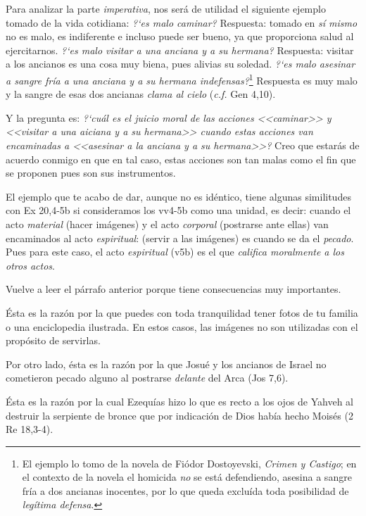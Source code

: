 \documentclass{article}
\begin{document}
Para analizar la parte \emph{imperativa}, nos ser\'a de utilidad el siguiente ejemplo tomado de la vida cotidiana: \emph{?`es malo caminar?} Respuesta: tomado en \emph{s\'i mismo} no es malo, es indiferente e incluso puede ser bueno, ya que proporciona salud al ejercitarnos. \emph{?`es malo visitar a una anciana y a su hermana?} Respuesta: visitar a los ancianos es una cosa muy biena, pues alivias su soledad. \emph{?`es malo asesinar a sangre fr\'{i}a a una anciana y a su hermana indefensas?}\footnote{El ejemplo lo tomo de la novela de Fiódor Dostoyevski, \emph{Crimen y Castigo}; en el contexto de la novela el homicida \emph{no} se est\'a defendiendo, asesina a sangre fr\'{i}a a dos ancianas inocentes, por lo que queda exclu\'{i}da toda posibilidad de \emph{leg\'{i}tima defensa}.} Respuesta es muy malo y la sangre de esas dos ancianas \emph{clama al cielo} (\emph{c.f.} Gen 4,10).

Y la pregunta es: \emph{?`cu\'al es el juicio moral de las acciones <<caminar>> y <<visitar a una aiciana y a su hermana>> cuando estas acciones van encaminadas a <<asesinar a la anciana y a su hermana>>?} Creo que estar\'as de acuerdo conmigo en que en tal caso, estas acciones son tan malas como el fin que se proponen pues son sus instrumentos.

El ejemplo que te acabo de dar, aunque no es id\'entico, tiene algunas similitudes con Ex 20,4-5b si consideramos los vv4-5b como una unidad, es decir: cuando el acto \emph{material} (hacer im\'agenes) y el acto \emph{corporal} (postrarse ante ellas) van encaminados al acto \emph{espiritual}: (servir a las im\'agenes) es cuando se da el \emph{pecado}. Pues para este caso, el acto \emph{espiritual} (v5b) es el que \emph{califica moralmente a los otros actos}.

Vuelve a leer el p\'arrafo anterior porque tiene consecuencias muy importantes.

\'Esta es la raz\'on por la que puedes con toda tranquilidad tener fotos de tu familia o una enciclopedia ilustrada. En estos casos, las im\'agenes no son utilizadas con el prop\'osito de servirlas.

Por otro lado, \'esta es la raz\'on por la que Josu\'e y los ancianos de Israel no cometieron pecado alguno al postrarse \emph{delante} del Arca (Jos 7,6).

\'Esta es la raz\'on por la cual Ezequ\'{i}as hizo lo que es recto a los ojos de Yahveh al destruir la serpiente de bronce que por indicaci\'on de Dios hab\'{i}a hecho Mois\'es (2 Re 18,3-4).
\end{document}
